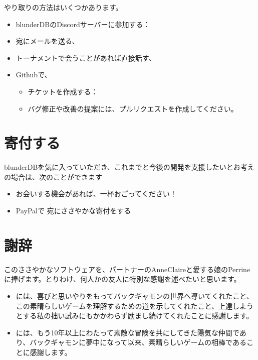 \documentclass[letterpaper,10pt,dvipdfmx]{sphinxmanual}
\begin{document}
\sphinxAtStartPar
やり取りの方法はいくつかあります。
\begin{itemize}
\item {} 
\sphinxAtStartPar
blunderDBのDiscordサーバーに参加する：

\item {} 
\sphinxAtStartPar
{} 宛にメールを送る、

\item {} 
\sphinxAtStartPar
トーナメントで会うことがあれば直接話す、

\item {} 
\sphinxAtStartPar
Githubで、
\begin{itemize}
\item {} 
\sphinxAtStartPar
チケットを作成する：

\item {} 
\sphinxAtStartPar
バグ修正や改善の提案には、プルリクエストを作成してください。

\end{itemize}

\end{itemize}


\chapter{寄付する}
\label{\detokenize{index:faire-un-don}}
\sphinxAtStartPar
blunderDBを気に入っていただき、これまでと今後の開発を支援したいとお考えの場合は、次のことができます
\begin{itemize}
\item {} 
\sphinxAtStartPar
お会いする機会があれば、一杯おごってください！

\item {} 
\sphinxAtStartPar
PayPalで  宛にささやかな寄付をする

\end{itemize}


\chapter{謝辞}
\label{\detokenize{index:remerciements}}
\sphinxAtStartPar
このささやかなソフトウェアを、パートナーのAnne\sphinxhyphen{}Claireと愛する娘のPerrineに捧げます。とりわけ、何人かの友人に特別な感謝を述べたいと思います。
\begin{itemize}
\item {} 
\sphinxAtStartPar
{} には、喜びと思いやりをもってバックギャモンの世界へ導いてくれたこと、この素晴らしいゲームを理解するための道を示してくれたこと、上達しようとする私の拙い試みにもかかわらず励まし続けてくれたことに感謝します。

\item {} 
\sphinxAtStartPar
{} には、もう10年以上にわたって素敵な冒険を共にしてきた陽気な仲間であり、バックギャモンに夢中になって以来、素晴らしいゲームの相棒であることに感謝します。

\end{itemize}



\renewcommand{\indexname}{索引}
\printindex
\end{document}
